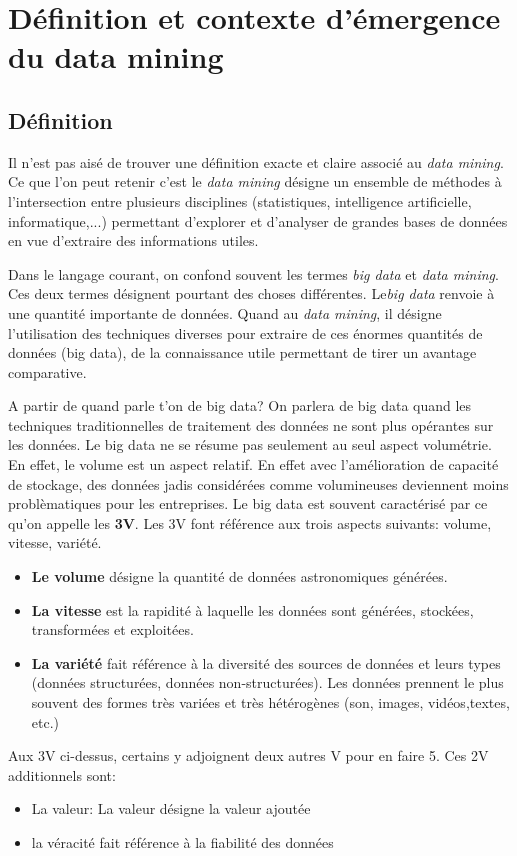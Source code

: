 \documentclass{article}\usepackage[]{graphicx}\usepackage[]{color}
\begin{document}

\section{Définition et contexte d'émergence du data mining}
\subsection{Définition}
Il n'est pas aisé de trouver une définition exacte et claire associé au \textit{data mining}.
Ce que l'on peut retenir c'est le \textit{data mining} désigne un ensemble de méthodes à l'intersection entre plusieurs disciplines (statistiques, intelligence artificielle, informatique,...) permettant d'explorer et d'analyser de grandes bases de données en vue d'extraire des informations utiles.

\par Dans le langage courant, on confond souvent les termes \textit{big data} et \textit{data mining}. Ces deux termes désignent pourtant des choses différentes. 
Le\textit{big data} renvoie à une quantité importante de données. Quand au \textit{data mining}, il désigne l'utilisation des techniques diverses pour extraire de ces énormes quantités de données (big data), de la connaissance utile permettant de tirer un avantage comparative.
\par A partir de quand parle t'on de big data? On parlera de big data quand les techniques traditionnelles de traitement des données ne sont plus opérantes sur les données. Le big data ne se résume pas seulement au seul aspect volumétrie. En effet, le volume est un aspect relatif. En effet avec l'amélioration de capacité de stockage, des données jadis considérées comme volumineuses deviennent moins problèmatiques pour les entreprises.
Le big data est souvent caractérisé par ce qu'on appelle les \textbf{3V}.
Les 3V font référence aux trois aspects suivants: volume, vitesse, variété.
\begin{itemize}
\item \textbf{Le volume} désigne la quantité de données astronomiques générées.
\item \textbf{La vitesse} est la rapidité à laquelle les données sont générées, stockées, transformées et exploitées.
\item \textbf{La variété} fait référence à la diversité des sources de données et leurs types (données structurées, données non-structurées).  Les données prennent le plus souvent des formes très variées et très hétérogènes (son, images, vidéos,textes, etc.)
\end{itemize}
Aux 3V ci-dessus, certains y adjoignent deux autres V pour en faire 5. Ces 2V additionnels sont:
\begin{itemize}
\item La valeur: La valeur désigne la valeur ajoutée 
\item la véracité fait référence à la fiabilité des données 
\end{itemize}
\end{document}
